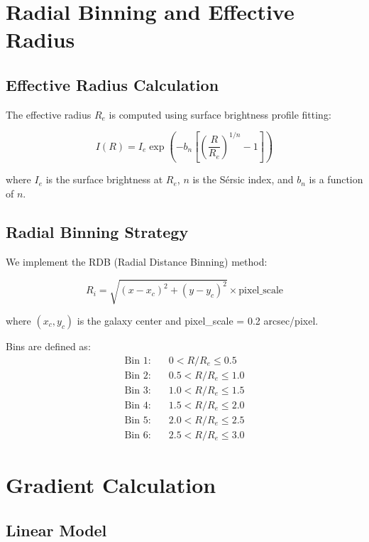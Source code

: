 \documentclass[11pt,a4paper]{article}
\begin{document}
\section{Radial Binning and Effective Radius}

\subsection{Effective Radius Calculation}

The effective radius $R_e$ is computed using surface brightness profile fitting:

\begin{equation}
I(R) = I_e \exp\left(-b_n\left[\left(\frac{R}{R_e}\right)^{1/n} - 1\right]\right)
\end{equation}

where $I_e$ is the surface brightness at $R_e$, $n$ is the Sérsic index, and $b_n$ is a function of $n$.

\subsection{Radial Binning Strategy}

We implement the RDB (Radial Distance Binning) method:

\begin{equation}
R_i = \sqrt{(x - x_c)^2 + (y - y_c)^2} \times \text{pixel\_scale}
\end{equation}

where $(x_c, y_c)$ is the galaxy center and pixel\_scale = 0.2 arcsec/pixel.

Bins are defined as:
\begin{align}
\text{Bin 1:} &\quad 0 < R/R_e \leq 0.5 \\
\text{Bin 2:} &\quad 0.5 < R/R_e \leq 1.0 \\
\text{Bin 3:} &\quad 1.0 < R/R_e \leq 1.5 \\
\text{Bin 4:} &\quad 1.5 < R/R_e \leq 2.0 \\
\text{Bin 5:} &\quad 2.0 < R/R_e \leq 2.5 \\
\text{Bin 6:} &\quad 2.5 < R/R_e \leq 3.0
\end{align}

\section{Gradient Calculation}

\subsection{Linear Model}
\end{document}
